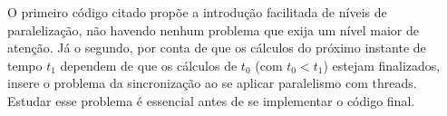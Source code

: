 O primeiro código citado propõe a introdução facilitada de níveis de paralelização, não havendo nenhum problema que exija
um nível maior de atenção. Já o segundo, por conta de que os cálculos do próximo instante de tempo $t_1$ dependem de que os cálculos de $t_0$
(com $t_0 < t_1$) estejam finalizados, insere o problema da sincronização ao se aplicar paralelismo com \gls{threads}. Estudar esse problema
é essencial antes de se implementar o código final.

